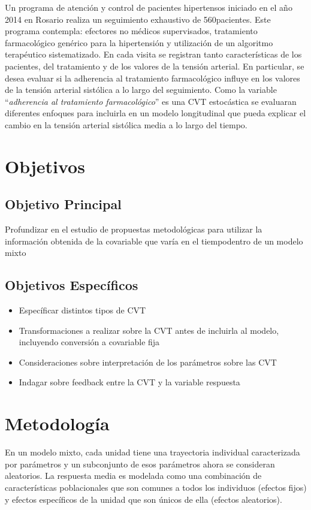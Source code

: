 \documentclass[12pt]{article}
\def\npatients{560}
\def\fullcovname{\emph{adherencia al tratamiento farmacológico}}
\def\cvt{covariable que varía en el tiempo}
\begin{document}
Un programa de atención y control de pacientes hipertensos iniciado en el año 2014 en Rosario realiza un seguimiento 
exhaustivo de \npatients pacientes. Este programa contempla: efectores no médicos supervisados, tratamiento farmacológico 
genérico para la hipertensión y utilización de un algoritmo terapéutico sistematizado. En cada visita se registran tanto 
características de los pacientes, del tratamiento y de los valores de la tensión arterial. En particular, se desea evaluar 
si la adherencia al tratamiento farmacológico influye en los valores de la tensión arterial sistólica a lo largo del 
seguimiento. Como la variable “\fullcovname” es una CVT estocástica se evaluaran diferentes enfoques para incluirla en un 
modelo longitudinal que pueda explicar el cambio en la tensión arterial sistólica media a lo largo del tiempo. 

\newpage
\section{Objetivos}

\subsection{Objetivo Principal}

Profundizar en el estudio de propuestas metodológicas para utilizar la información obtenida de la \cvt dentro de un 
modelo mixto

\subsection{Objetivos Específicos}

\begin{itemize}
	\item Específicar distintos tipos de CVT
	\item Transformaciones a realizar sobre la CVT antes de incluirla al modelo, incluyendo conversión a covariable fija
	\item Consideraciones sobre interpretación de los parámetros sobre las CVT
	\item Indagar sobre feedback entre la CVT y la variable respuesta
\end{itemize}

\newpage
\section{Metodología}

En un modelo mixto, cada unidad tiene una trayectoria individual caracterizada por parámetros y un subconjunto de esos 
parámetros ahora se consideran aleatorios. La respuesta media es modelada como una combinación de características 
poblacionales que son comunes a todos los individuos (efectos fijos) y efectos específicos de la unidad que son únicos de 
ella (efectos aleatorios).
\end{document}
